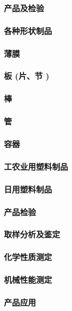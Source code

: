 \documentclass[UTF8]{../../ApplicationUniverse}
\begin{document}
    \subsubsection{产品及检验}
        \subsubsection{各种形状制品}
            \subsubsection{薄膜}
            \subsubsection{板 (片、节 )}
            \subsubsection{棒}
            \subsubsection{管}
            \subsubsection{容器}
        \subsubsection{工农业用塑料制品}
        \subsubsection{日用塑料制品}
        \subsubsection{产品检验}
            \subsubsection{取样分析及鉴定}
            \subsubsection{化学性质测定}
            \subsubsection{机械性能测定}
        \subsubsection{产品应用}
\end{document}
